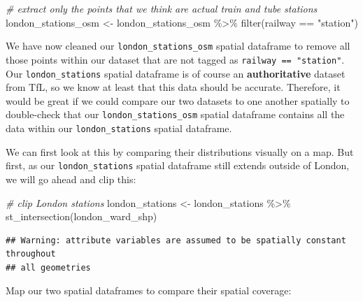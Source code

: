 \documentclass[
]{book}
\newenvironment{Shaded}{\begin{snugshade}}{\end{snugshade}}
\newcommand{\CommentTok}[1]{\textcolor[rgb]{0.56,0.35,0.01}{\textit{#1}}}
\newcommand{\FunctionTok}[1]{\textcolor[rgb]{0.00,0.00,0.00}{#1}}
\newcommand{\NormalTok}[1]{#1}
\newcommand{\OtherTok}[1]{\textcolor[rgb]{0.56,0.35,0.01}{#1}}
\newcommand{\SpecialCharTok}[1]{\textcolor[rgb]{0.00,0.00,0.00}{#1}}
\newcommand{\StringTok}[1]{\textcolor[rgb]{0.31,0.60,0.02}{#1}}
\begin{document}
\begin{Shaded}
\begin{Highlighting}[]
\CommentTok{\# extract only the points that we think are actual train and tube stations}
\NormalTok{london\_stations\_osm }\OtherTok{\textless{}{-}}\NormalTok{ london\_stations\_osm }\SpecialCharTok{\%\textgreater{}\%}
    \FunctionTok{filter}\NormalTok{(railway }\SpecialCharTok{==} \StringTok{"station"}\NormalTok{)}
\end{Highlighting}
\end{Shaded}

We have now cleaned our \texttt{london\_stations\_osm} spatial dataframe to remove all those points within our dataset that are not tagged as \texttt{railway\ ==\ "station"}. Our \texttt{london\_stations} spatial dataframe is of course an \textbf{authoritative} dataset from TfL, so we know at least that this data should be accurate. Therefore, it would be great if we could compare our two datasets to one another spatially to double-check that our \texttt{london\_stations\_osm} spatial dataframe contains all the data within our \texttt{london\_stations} spatial dataframe.

We can first look at this by comparing their distributions visually on a map. But first, as our \texttt{london\_stations} spatial dataframe still extends outside of London, we will go ahead and clip this:

\begin{Shaded}
\begin{Highlighting}[]
\CommentTok{\# clip London stations}
\NormalTok{london\_stations }\OtherTok{\textless{}{-}}\NormalTok{ london\_stations }\SpecialCharTok{\%\textgreater{}\%}
    \FunctionTok{st\_intersection}\NormalTok{(london\_ward\_shp)}
\end{Highlighting}
\end{Shaded}

\begin{verbatim}
## Warning: attribute variables are assumed to be spatially constant throughout
## all geometries
\end{verbatim}

Map our two spatial dataframes to compare their spatial coverage:
\end{document}
